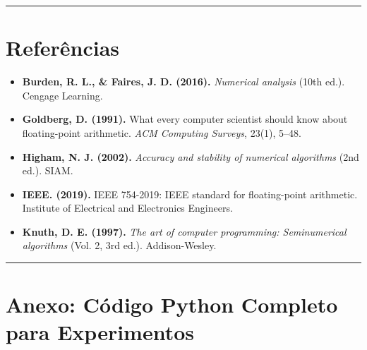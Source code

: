 \documentclass[
  11pt,
  letterpaper,
  DIV=11,
  numbers=noendperiod]{scrartcl}
\begin{document}
\begin{center}\rule{0.5\linewidth}{0.5pt}\end{center}

\section{Referências}\label{referuxeancias}

\begin{itemize}
\item
  \textbf{Burden, R. L., \& Faires, J. D. (2016).} \emph{Numerical
  analysis} (10th ed.). Cengage Learning.
\item
  \textbf{Goldberg, D. (1991).} What every computer scientist should
  know about floating-point arithmetic. \emph{ACM Computing Surveys},
  23(1), 5--48.
\item
  \textbf{Higham, N. J. (2002).} \emph{Accuracy and stability of
  numerical algorithms} (2nd ed.). SIAM.
\item
  \textbf{IEEE. (2019).} IEEE 754-2019: IEEE standard for floating-point
  arithmetic. Institute of Electrical and Electronics Engineers.
\item
  \textbf{Knuth, D. E. (1997).} \emph{The art of computer programming:
  Seminumerical algorithms} (Vol. 2, 3rd ed.). Addison-Wesley.
\end{itemize}

\begin{center}\rule{0.5\linewidth}{0.5pt}\end{center}

\section{Anexo: Código Python Completo para
Experimentos}\label{anexo-cuxf3digo-python-completo-para-experimentos}
\end{document}

